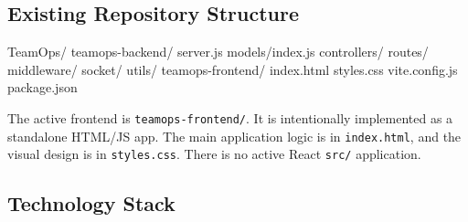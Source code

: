 \documentclass[
]{article}
\newenvironment{Shaded}{}{}
\newcommand{\NormalTok}[1]{#1}
\begin{document}
\subsection{Existing Repository
Structure}\label{existing-repository-structure}

\begin{Shaded}
\begin{Highlighting}[]
\NormalTok{TeamOps/}
\NormalTok{  teamops{-}backend/}
\NormalTok{    server.js}
\NormalTok{    models/index.js}
\NormalTok{    controllers/}
\NormalTok{    routes/}
\NormalTok{    middleware/}
\NormalTok{    socket/}
\NormalTok{    utils/}
\NormalTok{  teamops{-}frontend/}
\NormalTok{    index.html}
\NormalTok{    styles.css}
\NormalTok{    vite.config.js}
\NormalTok{    package.json}
\end{Highlighting}
\end{Shaded}

The active frontend is \texttt{teamops-frontend/}. It is intentionally
implemented as a standalone HTML/JS app. The main application logic is
in \texttt{index.html}, and the visual design is in \texttt{styles.css}.
There is no active React \texttt{src/} application.

\subsection{Technology Stack}\label{technology-stack}
\end{document}
